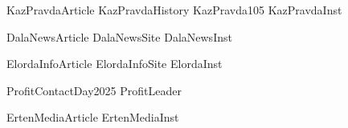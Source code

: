 \renewcommand\ExhibitGroup{Published}

{KazPravdaArticle}
{KazPravdaHistory}
{KazPravda105}
{KazPravdaInst}


{DalaNewsArticle}
{DalaNewsSite}
{DalaNewsInst}


{ElordaInfoArticle}
{ElordaInfoSite}
{ElordaInst}

{ProfitContactDay2025}
{ProfitLeader}






{ErtenMediaArticle}
{ErtenMediaInst}